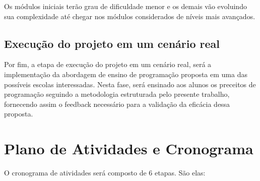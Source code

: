 \documentclass[12pt]{article}
\begin{document}
    Os módulos iniciais terão grau de dificuldade menor e os demais vão evoluindo sua complexidade até chegar nos módulos considerados de níveis mais avançados.
    
    \subsection{Execução do projeto em um cenário real}
   Por fim, a etapa de execução do projeto em um cenário real, será a implementação da abordagem de ensino de programação proposta em uma das possíveis escolas interessadas. Nesta fase, será ensinado aos alunos os preceitos de programação seguindo a metodologia estruturada pelo presente trabalho, fornecendo assim o feedback necessário para a validação da eficácia dessa proposta. 

	\section{Plano de Atividades e Cronograma}
	
	O cronograma de atividades será composto de 6 etapas. São elas:
    
\end{document}
